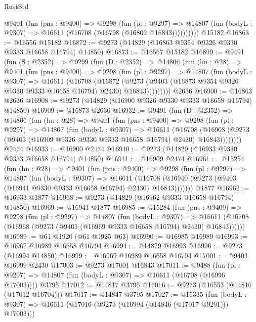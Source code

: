 \begin{lexlean}{RustStd}
\begin{coremodule}
{\begin{coremodule}
{{{{{{{{{{{{{{{{{{{{{{{{{{{{{{{{{{{{{{{{{{{{{{{{{{{{{{{          @9401
            (fun (pns : @9400) =>
            @9298
              (fun (pl : @9297) =>
              @14807 (fun (bodyL : @9307) => @16611 (@16708 (@16798 (@16802 @16843))))))))))
    @15182
@16863 := @16556 @15182
@16872 := @9273 (@14829 (@16863 @9354 @9326 @9330 @9333 @16658 @16794) @14850)
@16873 := @16567 @15182
@16899 := @9491
    (fun (S : @2352) =>
    @9299
      (fun (D : @2352) =>
      @14806
        (fun (hn : @28) =>
        @9401
          (fun (pns : @9400) =>
          @9298
            (fun (pl : @9297) =>
            @14807
              (fun (bodyL : @9307) =>
              @16611
                (@16708
                  (@16872
                    (@9273
                      (@9403 (@16873 @9354 @9326 @9330 @9333 @16658 @16794) @2430)
                      @16843)))))))))
    @2636
@16900 := @16863 @2636
@16908 := @9273 (@14829 (@16900 @9326 @9330 @9333 @16658 @16794) @14850)
@16909 := @16873 @2636
@16932 := @9491
    (fun (D : @2352) =>
    @14806
      (fun (hn : @28) =>
      @9401
        (fun (pns : @9400) =>
        @9298
          (fun (pl : @9297) =>
          @14807
            (fun (bodyL : @9307) =>
            @16611
              (@16708
                (@16908 (@9273 (@9403 (@16909 @9326 @9330 @9333 @16658 @16794) @2430) @16843))))))))
    @2474
@16933 := @16900 @2474
@16940 := @9273 (@14829 (@16933 @9330 @9333 @16658 @16794) @14850)
@16941 := @16909 @2474
@16961 := @15254
    (fun (hn : @28) =>
    @9401
      (fun (pns : @9400) =>
      @9298
        (fun (pl : @9297) =>
        @14807
          (fun (bodyL : @9307) =>
          @16611
            (@16708 (@16940 (@9273 (@9403 (@16941 @9330 @9333 @16658 @16794) @2430) @16843)))))))
    @1877
@16962 := @16933 @1877
@16968 := @9273 (@14829 (@16962 @9333 @16658 @16794) @14850)
@16969 := @16941 @1877
@16985 := @15284
    (fun (pns : @9400) =>
    @9298
      (fun (pl : @9297) =>
      @14807
        (fun (bodyL : @9307) =>
        @16611 (@16708 (@16968 (@9273 (@9403 (@16969 @9333 @16658 @16794) @2430) @16843))))))
@16989 := @61 @1920 (@61 @1925 @63)
@16990 := @16985 @16989
@16993 := @16962 @16989 @16658 @16794
@16994 := @14829 @16993
@16996 := @9273 (@16994 @14850)
@16999 := @16969 @16989 @16658 @16794
@17001 := @9403 @16999 @2430
@17003 := @9273 @17001 @16843
@17011 := @9488
    (fun (pl : @9297) => @14807 (fun (bodyL : @9307) => @16611 (@16708 (@16996 @17003))))
    @3795
@17012 := @14817 @3795
@17016 := @9273 (@16553 (@14816 (@17012 @16704)))
@17017 := @14847 @3795
@17027 := @15335
    (fun (bodyL : @9307) => @16611 (@17016 (@9273 (@16994 (@14846 (@17017 @9291))) @17003)))
}}}}}}}}}}}}}}}}}}}}}}}}}}}}}}}}}}}}}}}}}}}}}}}}}}}}}}}
\end{coremodule}}
\end{coremodule}
\end{lexlean}
